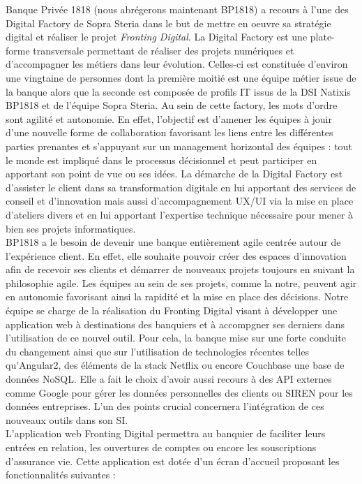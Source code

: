 	Banque Privée 1818 (nous abrégerons maintenant BP1818) a recours à l'une des Digital Factory de Sopra Steria dans le but de mettre en oeuvre sa stratégie digital et réaliser le projet \textit{Fronting Digital}. La Digital Factory est une plate-forme transversale permettant de réaliser des projets numériques et d'accompagner les métiers dans leur évolution. Celles-ci est constituée d'environ une vingtaine de personnes dont la première moitié est une équipe métier issue de la banque alors que la seconde est composée de profils IT issus de la DSI Natixis BP1818 et de l'équipe Sopra Steria. Au sein de cette factory, les mots d'ordre sont agilité et autonomie. En effet, l'objectif est d'amener les équipes à jouir d'une nouvelle forme de collaboration favorisant les liens entre les différentes parties prenantes et s'appuyant sur un management horizontal des équipes : tout le monde est impliqué dans le processus décisionnel et peut participer en apportant son point de vue ou ses idées. La démarche de la Digital Factory est d'assister le client dans sa transformation digitale en lui apportant des services de conseil et d'innovation mais aussi d'accompagnement UX/UI via la mise en place d'ateliers divers et en lui apportant l'expertise technique nécessaire pour mener à bien ses projets informatiques. \\
	
	BP1818 a le besoin de devenir une banque entièrement agile centrée autour de l'expérience client. En effet, elle souhaite pouvoir créer des espaces d'innovation afin de recevoir ses clients et démarrer de nouveaux projets toujours en suivant la philosophie agile. Les équipes au sein de ses projets, comme la notre, peuvent agir en autonomie favorisant ainsi la rapidité et la mise en place des décisions. Notre équipe se charge de la réalisation du Fronting Digital visant à développer une application web à destinations des banquiers et à accompgner ses derniers dans l'utilisation de ce nouvel outil. Pour cela, la banque mise sur une forte conduite du changement ainsi que sur l'utilisation de technologies récentes telles qu'Angular2, des éléments de la stack Netflix ou encore Couchbase une base de données NoSQL. Elle a fait le choix d'avoir aussi recours à des API externes comme Google pour gérer les données personnelles des clients ou SIREN pour les données entreprises. L'un des points crucial concernera l'intégration de ces nouveaux outils dans son SI. \\
	
	L'application web Fronting Digital permettra au banquier de faciliter leurs entrées en relation, les ouvertures de comptes ou encore les souscriptions d'assurance vie. Cette application est dotée d'un écran d'accueil proposant les fonctionnalités suivantes :
	
